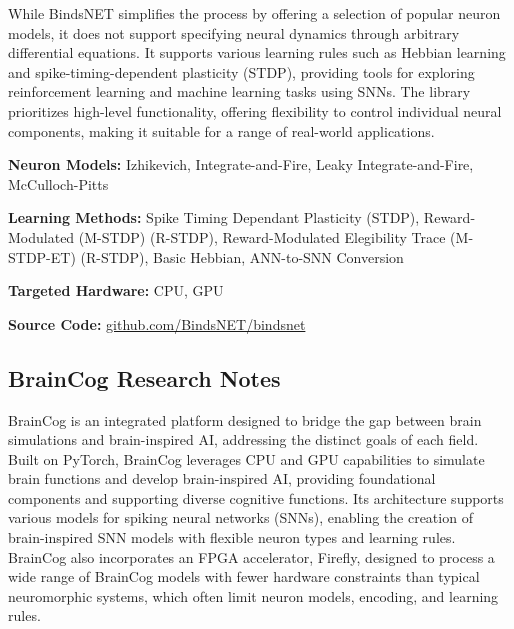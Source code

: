 While BindsNET simplifies the process by offering a selection of popular neuron models, it does not support specifying neural dynamics through arbitrary differential equations. It supports various learning rules such as Hebbian learning and spike-timing-dependent plasticity (STDP), providing tools for exploring reinforcement learning and machine learning tasks using SNNs. The library prioritizes high-level functionality, offering flexibility to control individual neural components, making it suitable for a range of real-world applications.

\begin{tcolorbox}[enhanced,attach boxed title to top center={yshift=-3mm,yshifttext=-1mm}, colback=blue!5!white,colframe=blue!75!black,colbacktitle=red!80!black, title=BindsNET at a Glance,fonttitle=\bfseries, boxed title style={size=small,colframe=red!50!black} ]

\textbf{Neuron Models:} Izhikevich, Integrate-and-Fire, Leaky Integrate-and-Fire, McCulloch-Pitts

\textbf{Learning Methods:} Spike Timing Dependant Plasticity (STDP), Reward-Modulated (M-STDP) (R-STDP), Reward-Modulated Elegibility Trace (M-STDP-ET) (R-STDP), Basic Hebbian, ANN-to-SNN Conversion  

\textbf{Targeted Hardware:} CPU, GPU 

\textbf{Source Code:} \href{https://github.com/BindsNET/bindsnet}{github.com/BindsNET/bindsnet}
\end{tcolorbox}
\subsection*{BrainCog Research Notes}\label{BrainCog}

BrainCog is an integrated platform designed to bridge the gap between brain simulations and brain-inspired AI, addressing the distinct goals of each field. Built on PyTorch, BrainCog leverages CPU and GPU capabilities to simulate brain functions and develop brain-inspired AI, providing foundational components and supporting diverse cognitive functions. Its architecture supports various models for spiking neural networks (SNNs), enabling the creation of brain-inspired SNN models with flexible neuron types and learning rules. BrainCog also incorporates an FPGA accelerator, Firefly, designed to process a wide range of BrainCog models with fewer hardware constraints than typical neuromorphic systems, which often limit neuron models, encoding, and learning rules.

